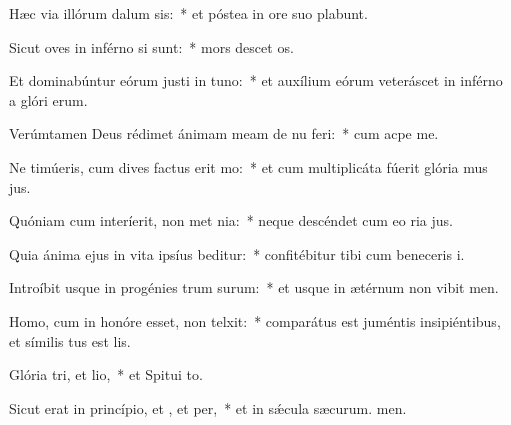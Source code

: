 \item Hæc via illórum dalum sis:~* et póstea in ore suo plabunt.
\item Sicut oves in inférno si sunt:~* mors descet os.
\item Et dominabúntur eórum justi in tuno:~* et auxílium eórum veteráscet in inférno a glóri erum.
\item Verúmtamen Deus rédimet ánimam meam de nu feri:~* cum acpe me.
\item Ne timúeris, cum dives factus erit mo:~* et cum multiplicáta fúerit glória mus jus.
\item Quóniam cum interíerit, non met nia:~* neque descéndet cum eo ria jus.
\item Quia ánima ejus in vita ipsíus beditur:~* confitébitur tibi cum beneceris i.
\item Introíbit usque in progénies trum surum:~* et usque in ætérnum non vibit men.
\item Homo, cum in honóre esset, non telxit:~* comparátus est juméntis insipiéntibus, et símilis tus est lis.
\item Glória tri, et lio,~* et Spitui to.
\item Sicut erat in princípio, et , et per,~* et in sǽcula sæcurum. men.
